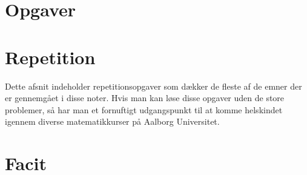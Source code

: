 \chapter{Opgaver}











\chapter{Repetition}\label{ch:rep}
Dette afsnit indeholder repetitionsopgaver som dækker de fleste af de emner der er gennemgået i disse noter. Hvis man kan løse disse opgaver uden de store problemer, så har man et fornuftigt udgangspunkt til at komme helskindet igennem diverse matematikkurser på Aalborg Universitet.


\chapter{Facit}










